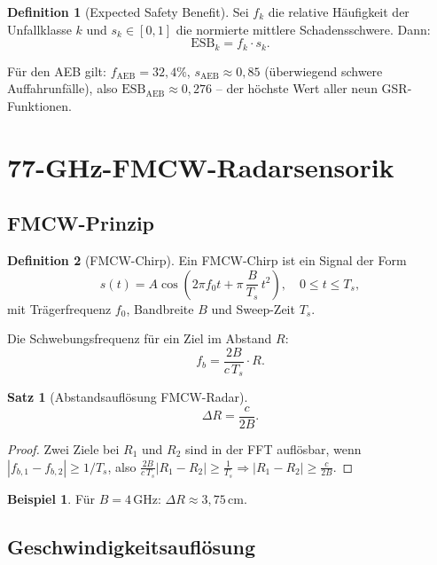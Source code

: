 \documentclass[a4paper,12pt]{article}
\theoremstyle{definition}
\newtheorem{definition}{Definition}
\newtheorem{beispiel}{Beispiel}
\newtheorem{satz}{Satz}
\begin{document}
\begin{definition}[Expected Safety Benefit]
\label{def:esb}
Sei $f_k$ die relative H\"aufigkeit der Unfallklasse $k$ und
$s_k \in [0,1]$ die normierte mittlere Schadensschwere. Dann:
\[
\mathrm{ESB}_k = f_k \cdot s_k.
\]
\end{definition}

F\"ur den AEB gilt: $f_\mathrm{AEB} = 32{,}4\%$, $s_\mathrm{AEB} \approx 0{,}85$
(\"uberwiegend schwere Auffahrunf\"alle), also
$\mathrm{ESB}_\mathrm{AEB} \approx 0{,}276$ -- der h\"ochste Wert aller
neun GSR-Funktionen.

\section{77-GHz-FMCW-Radarsensorik}
\label{sec:radar}

\subsection{FMCW-Prinzip}

\begin{definition}[FMCW-Chirp]
Ein FMCW-Chirp ist ein Signal der Form
\[
s(t) = A\cos\!\left(2\pi f_0 t + \pi\,\frac{B}{T_s}\,t^2\right),
\quad 0 \le t \le T_s,
\]
mit Tr\"agerfrequenz $f_0$, Bandbreite $B$ und Sweep-Zeit $T_s$.
\end{definition}

Die Schwebungsfrequenz f\"ur ein Ziel im Abstand $R$:
\[
f_b = \frac{2B}{c\,T_s}\cdot R.
\]

\begin{satz}[Abstandsaufl\"osung FMCW-Radar]
\label{satz:range_res}
\[
\Delta R = \frac{c}{2B}.
\]
\end{satz}

\begin{proof}
Zwei Ziele bei $R_1$ und $R_2$ sind in der FFT aufl\"osbar, wenn
$|f_{b,1}-f_{b,2}| \ge 1/T_s$, also
$\frac{2B}{c\,T_s}|R_1-R_2| \ge \frac{1}{T_s}
\Rightarrow |R_1-R_2| \ge \frac{c}{2B}$.\qedhere
\end{proof}

\begin{beispiel}
F\"ur $B = 4$\,GHz: $\Delta R \approx 3{,}75$\,cm.
\end{beispiel}

\subsection{Geschwindigkeitsaufl\"osung}
\end{document}
